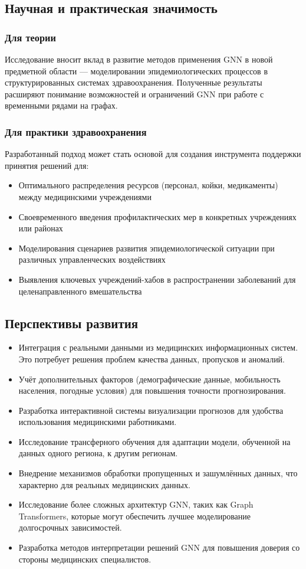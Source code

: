 \documentclass[12pt,a4paper]{article}
\begin{document}
	\subsection{Научная и практическая значимость}
	\subsubsection{Для теории}
	Исследование вносит вклад в развитие методов применения GNN в новой предметной области — моделировании эпидемиологических процессов в структурированных системах здравоохранения. Полученные результаты расширяют понимание возможностей и ограничений GNN при работе с временными рядами на графах.
	
	\subsubsection{Для практики здравоохранения}
	Разработанный подход может стать основой для создания инструмента поддержки принятия решений для:
	\begin{itemize}
		\item Оптимального распределения ресурсов (персонал, койки, медикаменты) между медицинскими учреждениями
		\item Своевременного введения профилактических мер в конкретных учреждениях или районах
		\item Моделирования сценариев развития эпидемиологической ситуации при различных управленческих воздействиях
		\item Выявления ключевых учреждений-хабов в распространении заболеваний для целенаправленного вмешательства
	\end{itemize}
	
	\subsection{Перспективы развития}
	\begin{itemize}
		\item Интеграция с реальными данными из медицинских информационных систем. Это потребует решения проблем качества данных, пропусков и аномалий.
		\item Учёт дополнительных факторов (демографические данные, мобильность населения, погодные условия) для повышения точности прогнозирования.
		\item Разработка интерактивной системы визуализации прогнозов для удобства использования медицинскими работниками.
		\item Исследование трансферного обучения для адаптации модели, обученной на данных одного региона, к другим регионам.
		\item Внедрение механизмов обработки пропущенных и зашумлённых данных, что характерно для реальных медицинских данных.
		\item Исследование более сложных архитектур GNN, таких как Graph Transformers, которые могут обеспечить лучшее моделирование долгосрочных зависимостей.
		\item Разработка методов интерпретации решений GNN для повышения доверия со стороны медицинских специалистов.
	\end{itemize}
	
\end{document}
